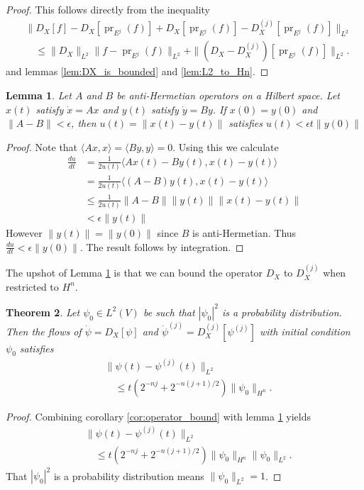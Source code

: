 \documentclass[letterpaper, 12 pt]{amsart}
\newtheorem{thm}{Theorem}[section]
\newtheorem{lem}[thm]{Lemma}
\DeclareMathOperator{\pr}{pr}
\begin{document}
  \begin{proof}
    This follows directly from the inequality
    \begin{align*}
      &\| D_X [f] - D_X[\pr_{E^j}(f)] + D_X[\pr_{E^j}(f)] - D_X^{(j)}[\pr_{E^j}(f)] \|_{L^2} \\
      &\quad \leq \|D_X\|_{L^2} \| f - \pr_{E^j}(f)\|_{L^2}
      + \| (D_X - D_X^{(j)}) [\pr_{E^j}(f)] \|_{L^2}.
    \end{align*}
    and lemmas \ref{lem:DX_is_bounded} and \ref{lem:L2_to_Hn}.
  \end{proof}

  \begin{lem} \label{lem:flow_bound}
    Let $A$ and $B$ be anti-Hermetian operators on a Hilbert space.
    Let $x(t)$ satisfy $\dot{x} = Ax$ and $y(t)$ satisfy $\dot{y} = By$.
    If $x(0) = y(0)$ and $\| A - B \| < \epsilon$, then $u(t) = \| x(t) - y(t) \|$ satisfies $u(t) < \epsilon t \| y(0) \|$
  \end{lem}
 
  \begin{proof}
    Note that $\langle Ax,x\rangle = \langle By,y \rangle = 0$.
    Using this we calculate
    \begin{align*}
      \frac{du}{dt} &= \frac{1}{2u(t)} \langle
      Ax(t) - By(t) , x(t) - y(t) \rangle \\
      &= \frac{1}{2u(t)} \langle
      (A-B)y(t) , x(t) - y(t) \rangle \\
      &\leq \frac{1}{2u(t)} \| A-B\|  \|y(t)\|  \|x(t) - y(t) \| \\
      &< \epsilon \|y(t) \|
    \end{align*}
    However $\| y(t) \| = \| y(0) \|$ since $B$ is anti-Hermetian.
    Thus $\frac{du}{dt} < \epsilon \| y(0) \|$.
    The result follows by integration.
  \end{proof}
  The upshot of Lemma \ref{lem:flow_bound} is that we can bound the
  operator $D_X$ to $D_X^{(j)}$ when restricted to $H^n$.
  \begin{thm}\label{thm:convergence}
    Let $\psi_0 \in L^2(V)$ be such that $|\psi_0|^2$ is a probability distribution.
    Then the flows of $\dot{\psi} = D_X[\psi]$ and $\dot{\psi}^{(j)} = D_X^{(j)}[\psi^{(j)}]$ with initial condition $\psi_0$
    satisfies
    \begin{align*}
      &\| \psi(t) - \psi^{(j)}(t) \|_{L^2}  \\
      &\quad\leq t( 2^{-nj} + 2^{-n(j+1)/2}) \| \psi_0\|_{H^n} .
    \end{align*}
  \end{thm}
  \begin{proof}
    Combining corollary \ref{cor:operator_bound} with lemma \ref{lem:flow_bound}
    yields
    \begin{align*}
      &\| \psi(t) - \psi^{(j)}(t) \|_{L^2}  \\
      &\quad\leq t( 2^{-nj} + 2^{-n(j+1)/2}) \| \psi_0 \|_{H^n} \| \psi_0 \|_{L^2}.
    \end{align*}
    That $|\psi_0|^2$ is a probability distribution means $\| \psi_0\|_{L^2} = 1$.
  \end{proof}
\end{document}
